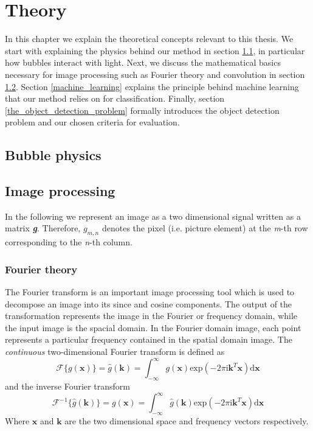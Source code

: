 \chapter{Theory}
In this chapter we explain the theoretical concepts relevant to this thesis. We start with explaining the physics behind our method in section \ref{bubble_physics}, in particular how bubbles interact with light. Next, we discuss the mathematical basics necessary for image processing such as Fourier theory and convolution in section \ref{image_processing}. Section \ref{machine_learning} explains the principle behind machine learning that our method relies on for classification. Finally, section \ref{the_object_detection_problem} formally introduces the object detection problem and our chosen criteria for evaluation. 

	\section{Bubble physics} \label{bubble_physics}
	
	\section{Image processing}	\label{image_processing}
	In the following we represent an image as a two dimensional signal written as a matrix \textit{\textbf{g}}. Therefore, $g_{m,n}$ denotes the pixel (i.e. picture element) at the \textit{m}-th row corresponding to the \textit{n}-th column. 
		\subsection{Fourier theory}
		The Fourier transform is an important image processing tool which is used to decompose an image into its since and cosine components. The output of the transformation represents the image in the Fourier or frequency domain, while the input image is the spacial domain. In the Fourier domain image, each point represents a particular frequency contained in the spatial domain image.
		The \textit{continuous} two-dimensional Fourier transform is defined as
		\begin{equation}
				\mathscr{F}\{ g(\mathbf{x})  \} = \hat{g}(\mathbf{k}) = 
				\int_{-\infty}^{\infty} g(\mathbf{x}) \text{exp}\left( -2 \pi \text{i} \mathbf{k}^T \mathbf{x}  \right) \text{d}\mathbf{x}
		\end{equation}
		and the inverse Fourier transform
		\begin{equation}
				\mathscr{F}^{-1}\{ \hat{g}(\mathbf{k}) \} = g(\mathbf{x}) =
				 \int_{-\infty}^{\infty} \hat{g}(\mathbf{k})
			\text{exp}\left( -2 \pi \text{i} \mathbf{k}^T \mathbf{x}  \right) \text{d}\mathbf{x}
		\end{equation}
		Where $\mathbf{x}$ and $\mathbf{k}$  are the two dimensional space and frequency vectors respectively. 
		

